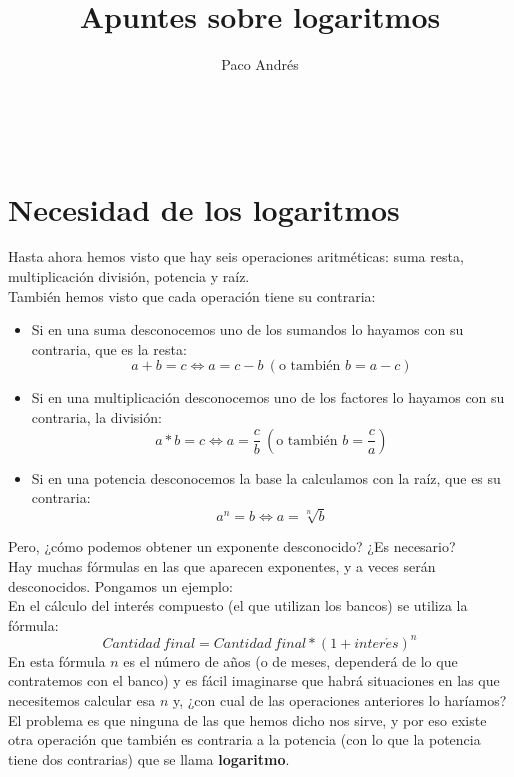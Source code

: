 \documentclass[a4paper,10pt,answers]{exam}
\def \autor{Paco Andrés}
\def \titulo{Apuntes sobre logaritmos}
\begin{document}
\newcommand{\e}{\mathrm{e}}

\title{\titulo}
\date{}
\author{\autor}
\maketitle

\begin{center}
\doclicenseLongText\\
\vspace{.25cm}
\doclicenseImage
\end{center}

\section{Necesidad de los logaritmos}
Hasta ahora hemos visto que hay seis operaciones aritméticas: suma resta, multiplicación división, potencia y raíz.\\
También hemos visto que cada operación tiene su contraria:
\begin{itemize}
	\item Si en una suma desconocemos uno de los sumandos lo hayamos con su contraria, que es la resta:
	\[a+b=c \Leftrightarrow a=c-b\ (\text{o también } b = a-c)\]
	\item Si en una multiplicación desconocemos uno de los factores lo hayamos con su contraria, la división:
	\[a * b = c \Leftrightarrow a= \frac{c}{b}\  \left( \text{o también } b = \frac{c}{a} \right)\]
	\item Si en una potencia desconocemos la base la calculamos con la raíz, que es su contraria:
	\[a^n = b \Leftrightarrow a = \sqrt[n]{b}\]
\end{itemize}
Pero, ¿cómo podemos obtener un exponente desconocido? ¿Es necesario?\\
Hay muchas fórmulas en las que aparecen exponentes, y a veces serán desconocidos. Pongamos un ejemplo:\\
En el cálculo del interés compuesto (el que utilizan los bancos) se utiliza la fórmula:
\[Cantidad\ final = Cantidad\ final * (1 + inter\acute{e}s)^n\]
En esta fórmula $n$ es el número de años (o de meses, dependerá de lo que contratemos con el banco) y es fácil imaginarse que habrá situaciones en las que necesitemos calcular esa $n$ y, ¿con cual de las operaciones anteriores lo haríamos?\\

El problema es que ninguna de las que hemos dicho nos sirve, y por eso existe otra operación que también es contraria a la potencia (con lo que la potencia tiene dos contrarias) que se llama \textbf{logaritmo}.
\end{document}

